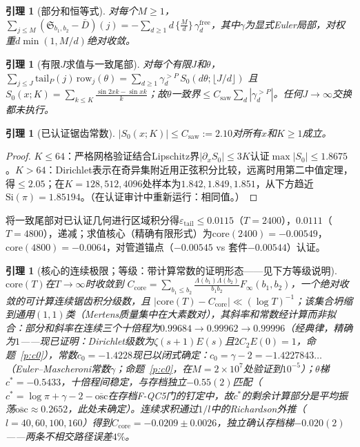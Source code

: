 \documentclass[11pt]{article}
\numberwithin{equation}{section}
\newtheorem{lemma}[theorem]{引理}
\theoremstyle{definition}
\theoremstyle{remark}
\newcommand{\LL}{\Lambda}
\newcommand{\SSS}{\mathfrak{S}}
\newcommand{\Si}{\mathrm{Si}}
\begin{document}
\begin{lemma}[部分和恒等式]\label{l:PS}
对每个$M\ge1$，
$\displaystyle\sum_{j\le M}(\SSS_{b_1,b_2}-\bar D)(j)=
-\sum_{d\ge1}d\,\bigl\{\tfrac Md\bigr\}\,
\gamma^{\mathrm{free}}_d$，其中$\gamma$为显式Euler局部，对权重$d\min(1,M/d)$绝对收敛。
\end{lemma}

\begin{lemma}[有限$J$求值与一致尾部]\label{l:E3}
对每个有限$J$和$\theta$，
$\sum_{j\le J}\mathrm{tail}_P(j)\,\mathrm{row}_j(\theta)
=\sum_{d\ge1}\gamma_d^{>P}\,S_0(d\theta;\lfloor J/d\rfloor)$
且$S_0(x;K)=\sum_{k\le K}\frac{\sin2xk-\sin xk}{k}$；故$\theta$一致界$\le C_{\mathrm{saw}}\sum_d
|\gamma_d^{>P}|$。任何$J\to\infty$交换都未执行。
\end{lemma}

\begin{lemma}[已认证锯齿常数]\label{l:S0}
$|S_0(x;K)|\le C_{\mathrm{saw}}:=2.10$对所有$x$和$K\ge1$成立。
\end{lemma}

\begin{proof}
$K\le64$：严格网格验证结合Lipschitz界$|\partial_xS_0|\le3K$认证$\max|S_0|\le1.8675$。$K>64$：Dirichlet表示在奇异集附近用正弦积分比较，远离时用第二中值定理，得$\le2.05$；在$K=128,512,4096$处样本为$1.842,1.849,1.851$，从下方趋近$\Si(\pi)=1.85194$。（在认证审计中重新运行：相同值。）
\end{proof}

\noindent 将一致尾部对已认证几何进行区域积分得$\varepsilon_{\mathrm{tail}}\le0.0115$（$T=2400$），$0.0111$（$T=4800$），递减；求值核心（精确有限形式）为$\mathrm{core}(2400)=-0.00549$，$\mathrm{core}(4800)=-0.0064$，对管道锚点（$-0.00545$ vs 套件$-0.00544$）认证。

\begin{lemma}[核心的连续极限；等级：带计算常数的证明形态——见下方等级说明]\label{l:CL}
$\mathrm{core}(T)$在$T\to\infty$时收敛到
$C_{\mathrm{core}}=\sum_{b_1\le b_2}\frac{\LL(b_1)\LL(b_2)}
{b_1b_2}F_\infty(b_1,b_2)$，一个绝对收敛的可计算连续锯齿积分级数，且
$|\mathrm{core}(T)-C_{\mathrm{core}}|\ll(\log T)^{-1}$；该集合坍缩到通用$(1,1)$类（Mertens质量集中在大素数对），其斜率和常数经计算而非拟合：部分和斜率在连续三个十倍程为$0.99684\to0.99962\to0.99996$（经典律，精确为$1$——现已\emph{证明}：Dirichlet级数为$\zeta(s+1)E(s)$且$2C_2E(0)=1$，命题~\ref{p:c0}），常数$c_0=-1.4228$现已\emph{以闭式确定}：$c_0=\gamma-2=-1.4227843\ldots$（Euler--Mascheroni常数$\gamma$；命题~\ref{p:c0}，在$M=2\times10^{7}$处验证到$10^{-5}$）；$\theta$梯$c^{*}=-0.5433$，十倍程间稳定，与存档独立$-0.55(2)$匹配（$c^{*}=\log\pi+\gamma-2-\overline{\mathrm{osc}}$在存档F-QC5门的钉定中，故$c^{*}$的剩余计算部分是平均振荡$\overline{\mathrm{osc}}\approx0.2652$，此处未确定）。连续求积通过$1/l$中的Richardson外推（$l=40,60,100,160$）得到$C_{\mathrm{core}}=-0.0209\pm0.0026$，独立确认存档梯$-0.020(2)$——两条不相交路径误差$4\%$。
\end{lemma}
\end{document}
